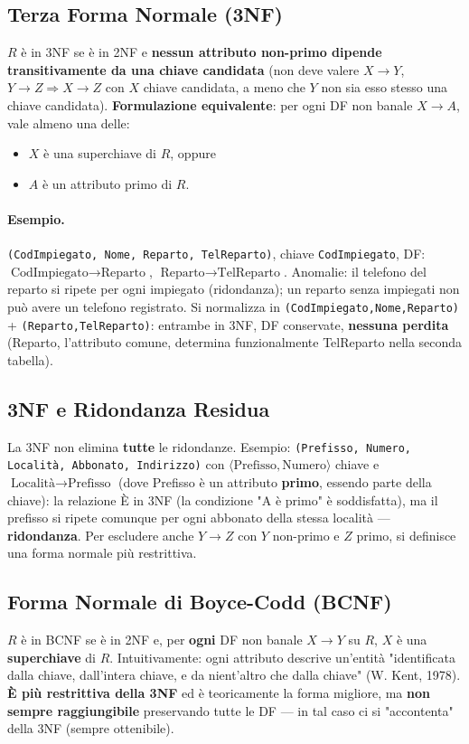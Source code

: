 \documentclass[12pt, a4paper]{article}
\begin{document}
\subsection{Terza Forma Normale (3NF)}
$R$ è in 3NF se è in 2NF e \textbf{nessun attributo non-primo dipende transitivamente da una chiave candidata} (non deve valere $X\to Y$, $Y \to Z \Rightarrow X \to Z$ con $X$ chiave candidata, a meno che $Y$ non sia esso stesso una chiave candidata). \textbf{Formulazione equivalente}: per ogni DF non banale $X \to A$, vale almeno una delle:
\begin{itemize}
    \item $X$ è una superchiave di $R$, oppure
    \item $A$ è un attributo primo di $R$.
\end{itemize}

\paragraph{Esempio.} \texttt{(CodImpiegato, Nome, Reparto, TelReparto)}, chiave \texttt{CodImpiegato}, DF: $\text{CodImpiegato}\to\text{Reparto}$, $\text{Reparto}\to\text{TelReparto}$. Anomalie: il telefono del reparto si ripete per ogni impiegato (ridondanza); un reparto senza impiegati non può avere un telefono registrato. Si normalizza in \texttt{(CodImpiegato,Nome,Reparto)} + \texttt{(Reparto,TelReparto)}: entrambe in 3NF, DF conservate, \textbf{nessuna perdita} (Reparto, l'attributo comune, determina funzionalmente TelReparto nella seconda tabella).

\subsection{3NF e Ridondanza Residua}
La 3NF non elimina \textbf{tutte} le ridondanze. Esempio: \texttt{(Prefisso, Numero, Località, Abbonato, Indirizzo)} con $\langle\text{Prefisso},\text{Numero}\rangle$ chiave e $\text{Località}\to\text{Prefisso}$ (dove Prefisso è un attributo \textbf{primo}, essendo parte della chiave): la relazione È in 3NF (la condizione "A è primo" è soddisfatta), ma il prefisso si ripete comunque per ogni abbonato della stessa località — \textbf{ridondanza}. Per escludere anche $Y \to Z$ con $Y$ non-primo e $Z$ primo, si definisce una forma normale più restrittiva.

\subsection{Forma Normale di Boyce-Codd (BCNF)}
$R$ è in BCNF se è in 2NF e, per \textbf{ogni} DF non banale $X \to Y$ su $R$, $X$ è una \textbf{superchiave} di $R$. Intuitivamente: ogni attributo descrive un'entità "identificata dalla chiave, dall'intera chiave, e da nient'altro che dalla chiave" (W. Kent, 1978). \textbf{È più restrittiva della 3NF} ed è teoricamente la forma migliore, ma \textbf{non sempre raggiungibile} preservando tutte le DF — in tal caso ci si "accontenta" della 3NF (sempre ottenibile).
\end{document}
